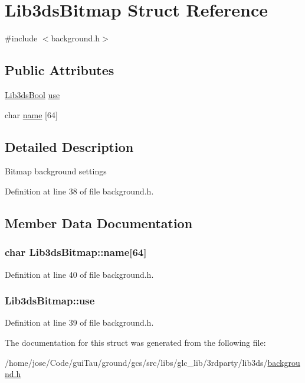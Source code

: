 \hypertarget{struct_lib3ds_bitmap}{\section{Lib3ds\-Bitmap Struct Reference}
\label{struct_lib3ds_bitmap}
}


{\ttfamily \#include $<$background.\-h$>$}

\subsection*{Public Attributes}
\begin{DoxyCompactItemize}
\item 
\hyperlink{types_8h_a89dd7398a9ebbbf28011f8c32df67ad3}{Lib3ds\-Bool} \hyperlink{struct_lib3ds_bitmap_a7b8190111ca7a5eb04bf235a36cb353d}{use}
\item 
char \hyperlink{struct_lib3ds_bitmap_a8057bea3f8ff2e35e8fc2378f7ea4903}{name} \mbox{[}64\mbox{]}
\end{DoxyCompactItemize}


\subsection{Detailed Description}
Bitmap background settings 

Definition at line 38 of file background.\-h.



\subsection{Member Data Documentation}
\hypertarget{struct_lib3ds_bitmap_a8057bea3f8ff2e35e8fc2378f7ea4903}{
\subsubsection[{name}]{\setlength{\rightskip}{0pt plus 5cm}char Lib3ds\-Bitmap\-::name\mbox{[}64\mbox{]}}}\label{struct_lib3ds_bitmap_a8057bea3f8ff2e35e8fc2378f7ea4903}


Definition at line 40 of file background.\-h.

\hypertarget{struct_lib3ds_bitmap_a7b8190111ca7a5eb04bf235a36cb353d}{
\subsubsection[{use}]{ Lib3ds\-Bitmap\-::use}}\label{struct_lib3ds_bitmap_a7b8190111ca7a5eb04bf235a36cb353d}


Definition at line 39 of file background.\-h.



The documentation for this struct was generated from the following file\-:\begin{DoxyCompactItemize}
\item 
/home/jose/\-Code/gui\-Tau/ground/gcs/src/libs/glc\-\_\-lib/3rdparty/lib3ds/\hyperlink{background_8h}{background.\-h}\end{DoxyCompactItemize}
